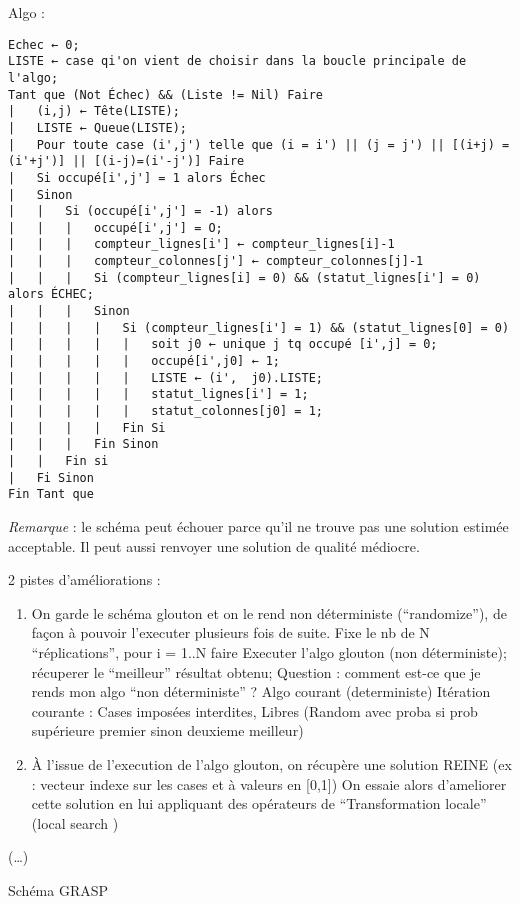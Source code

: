 \documentclass[]{article}
\begin{document}
Algo :

\begin{verbatim}
Echec ← 0;
LISTE ← case qi'on vient de choisir dans la boucle principale de l'algo;
Tant que (Not Échec) && (Liste != Nil) Faire
|   (i,j) ← Tête(LISTE);
|   LISTE ← Queue(LISTE);
|   Pour toute case (i',j') telle que (i = i') || (j = j') || [(i+j) = (i'+j')] || [(i-j)=(i'-j')] Faire
|   Si occupé[i',j'] = 1 alors Échec
|   Sinon 
|   |   Si (occupé[i',j'] = -1) alors 
|   |   |   occupé[i',j'] = O;
|   |   |   compteur_lignes[i'] ← compteur_lignes[i]-1
|   |   |   compteur_colonnes[j'] ← compteur_colonnes[j]-1
|   |   |   Si (compteur_lignes[i] = 0) && (statut_lignes[i'] = 0) alors ÉCHEC;
|   |   |   Sinon
|   |   |   |   Si (compteur_lignes[i'] = 1) && (statut_lignes[0] = 0)
|   |   |   |   |   soit j0 ← unique j tq occupé [i',j] = 0;
|   |   |   |   |   occupé[i',j0] ← 1;
|   |   |   |   |   LISTE ← (i',  j0).LISTE;
|   |   |   |   |   statut_lignes[i'] = 1;
|   |   |   |   |   statut_colonnes[j0] = 1;
|   |   |   |   Fin Si
|   |   |   Fin Sinon
|   |   Fin si
|   Fi Sinon
Fin Tant que
\end{verbatim}

\emph{Remarque} : le schéma peut échouer parce qu'il ne trouve pas une
solution estimée acceptable. Il peut aussi renvoyer une solution de
qualité médiocre.

2 pistes d'améliorations :

\begin{enumerate}
\def\labelenumi{\arabic{enumi}.}
\item
  On garde le schéma glouton et on le rend non déterministe
  (``randomize''), de façon à pouvoir l'executer plusieurs fois de
  suite. Fixe le nb de N ``réplications'', pour i = 1..N faire Executer
  l'algo glouton (non déterministe); récuperer le ``meilleur'' résultat
  obtenu; Question : comment est-ce que je rends mon algo ``non
  déterministe'' ? Algo courant (deterministe) Itération courante :
  Cases imposées interdites, Libres (Random avec proba si prob
  supérieure premier sinon deuxieme meilleur)
\item
  À l'issue de l'execution de l'algo glouton, on récupère une solution
  REINE (ex : vecteur indexe sur les cases et à valeurs en {[}0,1{]}) On
  essaie alors d'ameliorer cette solution en lui appliquant des
  opérateurs de ``Transformation locale'' (local search )
\end{enumerate}

(\ldots{})

Schéma GRASP
\end{document}
